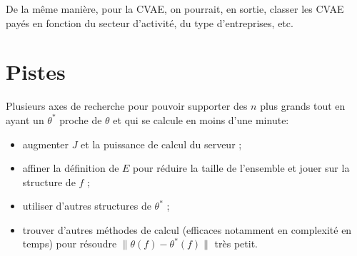 \documentclass[12pt]{article}
\begin{document}
De la même manière, pour la CVAE, on pourrait, en sortie, classer les CVAE payés en fonction du secteur
d'activité, du type d'entreprises, etc.

\section{Pistes}

Plusieurs axes de recherche pour pouvoir supporter des $n$ plus grands tout en ayant un $\theta^*$ proche
de $\theta$ et qui se calcule en moins d'une minute:
\begin{itemize}
  \item augmenter $J$ et la puissance de calcul du serveur ;
  \item affiner la définition de $E$ pour réduire la taille de l'ensemble et jouer sur la structure de $f$ ;
  \item utiliser d'autres structures de $\theta^*$ ;
  \item trouver d'autres méthodes de calcul (efficaces notamment en complexité en temps) pour résoudre $\|\theta(f) - \theta^*(f)\|$ très petit.
\end{itemize}
\end{document}
